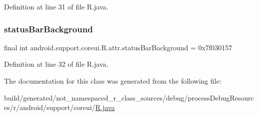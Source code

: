 Definition at line 31 of file R.\+java.

\mbox{\label{classandroid_1_1support_1_1coreui_1_1_r_1_1attr_a3bb368bee4659b4c7a943b2d3d2df47c}} 
\subsubsection{\texorpdfstring{statusBarBackground}{statusBarBackground}}
{\footnotesize\ttfamily final int android.\+support.\+coreui.\+R.\+attr.\+status\+Bar\+Background = 0x7f030157\hspace{0.3cm}{\ttfamily [static]}}



Definition at line 32 of file R.\+java.



The documentation for this class was generated from the following file\+:\begin{DoxyCompactItemize}
\item 
build/generated/not\+\_\+namespaced\+\_\+r\+\_\+class\+\_\+sources/debug/process\+Debug\+Resources/r/android/support/coreui/\mbox{\hyperlink{android_2support_2coreui_2_r_8java}{R.\+java}}\end{DoxyCompactItemize}

